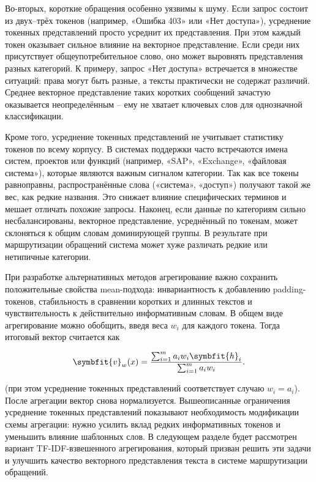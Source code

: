 \documentclass[14pt,a4paper]{extarticle}
\numberwithin{figure}{section}
\numberwithin{table}{section}
\begin{document}
Во-вторых, короткие обращения особенно уязвимы к шуму. Если запрос
состоит из двух--трёх токенов (например, «Ошибка 403» или «Нет
доступа»), усреднение токенных представлений просто усреднит их представления. При этом
каждый токен оказывает сильное влияние на векторное представление. Если среди них
присутствует общеупотребительное слово, оно может выровнять
представления разных категорий. К примеру, запрос «Нет доступа»
встречается в множестве ситуаций: права могут быть разные, а тексты
практически не содержат различий. Среднее векторное представление таких коротких
сообщений зачастую оказывается неопределённым -- ему не хватает ключевых
слов для однозначной классификации.

Кроме того, усреднение токенных представлений не учитывает статистику токенов по всему
корпусу. В системах поддержки часто встречаются имена систем, проектов
или функций (например, «SAP», «Exchange», «файловая система»), которые
являются важным сигналом категории. Так как все токены равноправны,
распространённые слова («система», «доступ») получают такой же вес, как
редкие названия. Это снижает влияние специфических терминов и мешает
отличать похожие запросы. Наконец, если данные по категориям сильно
несбалансированы, векторное представление, усреднённый по токенам, может склоняться к
общим словам доминирующей группы. В результате при маршрутизации
обращений система может хуже различать редкие или нетипичные категории.

При разработке альтернативных методов агрегирование важно сохранить
положительные свойства mean-подхода: инвариантность к добавлению
padding-токенов, стабильность в сравнении коротких и длинных текстов и
чувствительность к действительно информативным словам. В общем виде
агрегирование можно обобщить, введя веса \(w_i\) для каждого токена. Тогда
итоговый вектор считается как

\begin{equation}\symbfit{v}_{w}(x)=\frac{\sum_{i=1}^{m} a_iw_i\symbfit{h}_i}{\sum_{i=1}^{m}a_iw_i}.\label{eq:weighted-pooling-general}\end{equation}

(при этом усреднение токенных представлений соответствует случаю \(w_i=a_i\)). После
агрегации вектор снова нормализуется. Вышеописанные
ограничения усреднение токенных представлений показывают необходимость модификации схемы
агрегации: нужно усилить вклад редких информативных токенов и уменьшить
влияние шаблонных слов. В следующем разделе будет рассмотрен вариант
TF-IDF-взвешенного агрегирования, который призван решить эти задачи и улучшить
качество векторного представления текста в системе маршрутизации обращений.
\end{document}
